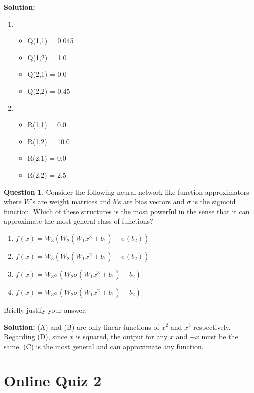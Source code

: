 \documentclass{article}
\theoremstyle{definition}
\newtheorem{question}{Question}
\begin{document}
\noindent\textbf{Solution:}
\begin{enumerate}
    \item
    \begin{itemize}
        \item Q(1,1) = 0.045
        \item Q(1,2) = 1.0
        \item Q(2,1) = 0.0
        \item Q(2,2) = 0.45
    \end{itemize}
    \item
    \begin{itemize}
        \item R(1,1) = 0.0
        \item R(1,2) = 10.0
        \item R(2,1) = 0.0
        \item R(2,2) = 2.5
    \end{itemize}
\end{enumerate}

\begin{question}
Consider the following neural-network-like function approximators where $W$'s are weight matrices and $b$'s are bias vectors and $\sigma$ is the sigmoid function. 
Which of these structures is the most powerful in the sense that it can approximate the most general class of functions?

\begin{enumerate}[label=(\Alph*)]
\item $f(x) = W_3(W_2(W_1 x^3 + b_1) + \sigma(b_2))$
\item $f(x) = W_3(W_2(W_1 x^2 + b_1) + \sigma(b_2))$
\item $f(x) = W_3 \sigma(W_2 \sigma(W_1 x^3 + b_1) + b_2)$
\item $f(x) = W_3 \sigma(W_2 \sigma(W_1 x^2 + b_1) + b_2)$
\end{enumerate}

Briefly justify your answer.
\end{question}

\noindent\textbf{Solution:}
(A) and (B) are only linear functions of $x^2$ and $x^3$ respectively. Regarding (D), since $x$ is squared, the output for any $x$ and $-x$ must be the same. (C) is the most general and can approximate any function.

\section*{Online Quiz 2}
\end{document}
